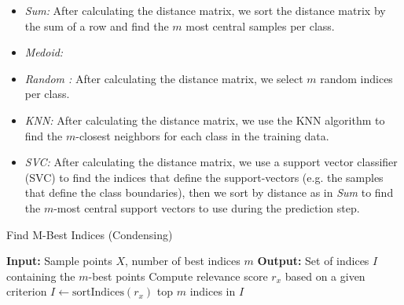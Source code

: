 \documentclass{article}
\begin{document}
\begin{itemize}
    \item \textit{Sum:} After calculating the distance matrix, we sort the distance matrix by the sum of a row and find the $m$ most central samples per class.
    \item \textit{Medoid: }
    \item \textit{Random : } After calculating the distance matrix, we select $m$ random indices per class.
    \item \textit{KNN: } After calculating the distance matrix, we use the KNN algorithm to find the $m$-closest neighbors for each class in the training data.
    \item \textit{SVC: } After calculating the distance matrix, we use a support vector classifier (SVC) to find the indices that define the support-vectors (e.g. the samples that define the class boundaries), then we sort by distance as in \textit{Sum} to find the $m$-most central support vectors to use during the prediction step.
\end{itemize}


\begin{algorithm}
  \caption{Find M-Best Indices (Condensing)}
  \label{alg:m-best-indices}
  \begin{algorithmic}
    \State \textbf{Input:} Sample points $X$, number of best indices $m$
    \State \textbf{Output:} Set of indices $I$ containing the $m$-best points
      \State Compute relevance score $r_x$ based on a given criterion
    \State $I \gets \text{sortIndices}(r_x)$
    \State \Return top $m$ indices in $I$
  \end{algorithmic}
\end{algorithm}




\end{document}
